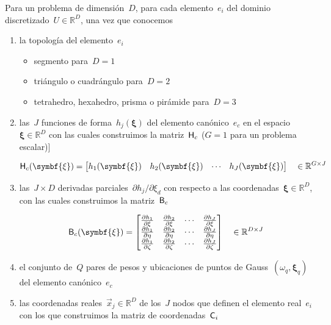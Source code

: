 \documentclass[
  12pt,
  a4paper,
  table]{scrbook}
\providecommand{\tightlist}{%
  \setlength{\itemsep}{0pt}\setlength{\parskip}{0pt}}\usepackage{longtable,booktabs,array}
\theoremstyle{plain}
\theoremstyle{definition}
\theoremstyle{plain}
\theoremstyle{plain}
\theoremstyle{remark}
\begin{document}
Para un problema de dimensión~\(D\), para cada elemento~\(e_i\) del
dominio discretizado~\(U \in \mathbb{R}^D\), una vez que conocemos

\begin{enumerate}
\def\labelenumi{\arabic{enumi}.}
\item
  la topología del elemento~\(e_i\)

  \begin{itemize}
  \tightlist
  \item
    segmento para~\(D=1\)
  \item
    triángulo o cuadrángulo para~\(D=2\)
  \item
    tetrahedro, hexahedro, prisma o pirámide para~\(D=3\)
  \end{itemize}
\item
  las~\(J\) funciones de forma~\(h_j(\symbf{\xi})\) del elemento
  canónico~\(e_c\) en el espacio~\(\symbf{\xi} \in \mathbb{R}^D\) con
  las cuales construimos la matriz~\(\mathsf{H}_c\) (\(G=1\) para un
  problema escalar){]}

  \[
  \mat{H}_c(\symbf{\xi}) = \begin{bmatrix}h_1(\symbf{\xi}) & h_2(\symbf{\xi}) & \cdots & h_J(\symbf{\xi}) \end{bmatrix} \quad \in \mathbb{R}^{G \times J}
  \]
\item
  las~\(J \times D\) derivadas parciales~\(\partial h_j/\partial \xi_d\)
  con respecto a las coordenadas~\(\symbf{\xi} \in \mathbb{R}^D\), con
  las cuales construimos la matriz~\(\mathsf{B}_c\)

  \[
  \mat{B}_c(\symbf{\xi}) =
  \begin{bmatrix}
  \frac{\partial h_1}{\partial \xi}   & \frac{\partial h_2}{\partial \xi}   & \cdots & \frac{\partial h_J}{\partial \xi} \\
  \frac{\partial h_1}{\partial \eta}  & \frac{\partial h_2}{\partial \eta}  & \cdots & \frac{\partial h_J}{\partial \eta} \\
  \frac{\partial h_1}{\partial \zeta} & \frac{\partial h_2}{\partial \zeta} & \cdots & \frac{\partial h_J}{\partial \zeta}
  \end{bmatrix} \quad \in \mathbb{R}^{D \times J}
  \]
\item
  el conjunto de~\(Q\) pares de pesos y ubicaciones de puntos de
  Gauss~\((\omega_q, \symbf{\xi}_q)\) del elemento canónico~\(e_c\)
\item
  las coordenadas reales~\(\vec{x}_j \in \mathbb{R}^D\) de los~\(J\)
  nodos que definen el elemento real~\(e_i\) con los que construimos la
  matriz de coordenadas~\(\mathsf{C}_i\)


\end{enumerate}
\end{document}

